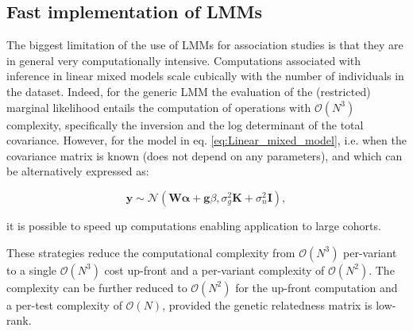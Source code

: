 \subsection{Fast implementation of LMMs}

The biggest limitation of the use of LMMs for association studies is that they are in general very computationally intensive.
Computations associated with inference in linear mixed models scale cubically with
the number of individuals in the dataset. 
Indeed, for the generic LMM
the evaluation of the (restricted) marginal likelihood entails the computation of operations with $\mathcal{O}(N^3)$ complexity, specifically the inversion and the log determinant of the total covariance. %
However, for the model in eq. \eqref{eq:Linear_mixed_model}, i.e. when the covariance matrix is known (does not depend on any parameters), and which can be alternatively expressed as:

\begin{equation}\label{eq:LMM_MVN}
 \mathbf{y} \sim  \mathcal{N}(\mathbf{W}\boldsymbol{\alpha} + \mathbf{g}\beta, \sigma_g^2\mathbf{K} + \sigma_n^2\mathbf{I}),
\end{equation}

it is possible to speed up computations \cite{kang2008efficient, kang2010variance, lippert2011fast, zhou2012genome} enabling application to large cohorts. 

These strategies reduce the computational complexity from $\mathcal{O}(N^3)$
per-variant to a single  $\mathcal{O}(N^3)$ cost up-front and a per-variant complexity of  $\mathcal{O}(N^2)$.
The complexity can be further reduced to $\mathcal{O}(N^2)$ for the up-front computation and a per-test complexity of  $\mathcal{O}(N)$, provided the genetic relatedness matrix is low-rank. \\



